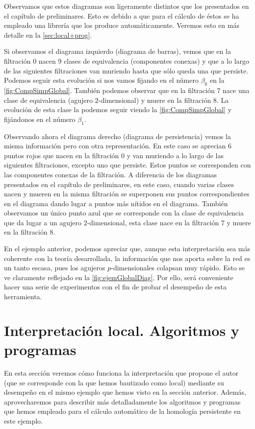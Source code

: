 \documentclass[12pt, a4paper, twoside]{book}
\numberwithin{equation}{section}
\theoremstyle{definition}
\newenvironment{ejem}
  {\pushQED{\qed}\renewcommand{\qedsymbol}{$\blacktriangleleft$}\ejemplo}
  {\popQED\endejemplo}
\theoremstyle{remark}
\theoremstyle{plain}
\begin{document}
\begin{ejem}
	Observamos que estos diagramas son ligeramente distintos que los 
	presentados en el capítulo de preliminares. Esto es debido a que para
	el cálculo de éstos se ha empleado una librería que los produce 
	automáticamente. Veremos esto en más detalle en la 
	\autoref{sec:local+prog}.

	Si observamos el diagrama izquierdo (diagrama de barras), vemos que en 
	la filtración 0 nacen 9 clases de equivalencia (componentes conexas) y
	que a lo largo de las siguientes filtraciones van muriendo hasta que 
	sólo queda una que persiste. Podemos seguir esta evolución si nos 
	vamos fijando en el número $\beta_{0}$ en  
	la \autoref{fig:CompSimpGlobal}. También podemos observar que en la 
	filtración 7 nace una clase de equivalencia (agujero $2$-dimensional) 
	y muere en la filtración 8. La evolución de esta clase la podemos 
	seguir viendo la \autoref{fig:CompSimpGlobal} y fijándonos en el 
	número $\beta_{1}$.

	Observando ahora el diagrama derecho (diagrama de persistencia) vemos 
	la misma información pero con otra representación. En este caso se 
	aprecian 6 puntos rojos que nacen en la filtración 0 y van muriendo a 
	lo largo de las siguientes filtraciones, excepto uno que persiste. 
	Estos puntos se corresponden 
	con las componentes conexas de la filtración. A diferencia de los 
	diagramas presentados en el capítulo de preliminares, en este caso, 
	cuando varias clases nacen y mueren en la misma filtración se 
	superponen sus puntos correspondientes en el diagrama dando lugar a 
	puntos más nítidos en el diagrama. También observamos un único punto 
	azul que se corresponde con la clase de equivalencia que da lugar a un
	agujero $2$-dimensional, esta clase nace en la filtración 7 y muere en
	la filtración 8.
	\end{ejem}

	En el ejemplo anterior, podemos apreciar que, aunque esta 
	interpretación sea más coherente con la teoría desarrollada, la 
	información que nos aporta sobre la red es un tanto escasa, pues los 
	agujeros $p$-dimensionales colapsan muy rápido. Esto se ve claramente 
	reflejado en la \autoref{fig:ejemGlobalDiag}. Por ello, 
	será conveniente hacer una serie de experimentos con el fin de probar
	el desempeño de esta herramienta.

	\section{Interpretación local. Algoritmos y programas}
	\label{sec:local+prog}
	En esta sección veremos cómo funciona la interpretación que propone 
	el autor (que se corresponde con la que hemos bautizado como local) 
	mediante su desempeño en el mismo ejemplo que hemos visto en la 
	sección anterior. Además, aprovecharemos para describir más 
	detalladamente los algoritmos y programas que hemos empleado para el 
	cálculo automático de la homología persistente en este ejemplo.
\end{document}
